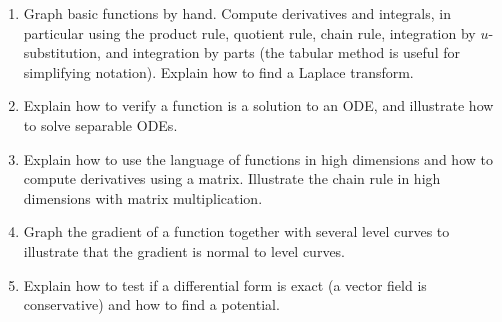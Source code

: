 
\begin{enumerate}

\item Graph basic functions by hand. Compute derivatives and integrals, in particular using the product rule, quotient rule, chain rule, integration by $u$-substitution, and integration by parts (the tabular method is useful for simplifying notation). Explain how to find a Laplace transform. 
\item Explain how to verify a function is a solution to an ODE, and illustrate how to solve separable ODEs.
\item Explain how to use the language of functions in high dimensions and how to compute derivatives using a matrix. Illustrate the chain rule in high dimensions with matrix multiplication.
\item Graph the gradient of a function together with several level curves to illustrate that the gradient is normal to level curves.
\item Explain how to test if a differential form is exact (a vector field is conservative) and how to find a potential. 

\end{enumerate}
